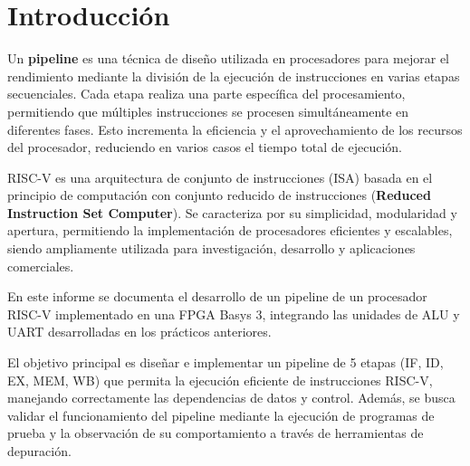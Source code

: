 \section{Introducción}

Un \textbf{pipeline} es una técnica de diseño utilizada en procesadores para mejorar el rendimiento mediante la división de la ejecución de instrucciones en varias etapas secuenciales. Cada etapa realiza una parte específica del procesamiento, permitiendo que múltiples instrucciones se procesen simultáneamente en diferentes fases. Esto incrementa la eficiencia y el aprovechamiento de los recursos del procesador, reduciendo en varios casos el tiempo total de ejecución.

RISC-V es una arquitectura de conjunto de instrucciones (ISA) basada en el principio de computación con conjunto reducido de instrucciones (\textbf{Reduced Instruction Set Computer}). Se caracteriza por su simplicidad, modularidad y apertura, permitiendo la implementación de procesadores eficientes y escalables, siendo ampliamente utilizada para investigación, desarrollo y aplicaciones comerciales.

En este informe se documenta el desarrollo de un pipeline de un procesador RISC-V implementado en una FPGA Basys 3, integrando las unidades de ALU y UART desarrolladas en los prácticos anteriores.  

El objetivo principal es diseñar e implementar un pipeline de 5 etapas (IF, ID, EX, MEM, WB) que permita la ejecución eficiente de instrucciones RISC-V, manejando correctamente las dependencias de datos y control. Además, se busca validar el funcionamiento del pipeline mediante la ejecución de programas de prueba y la observación de su comportamiento a través de herramientas de depuración.